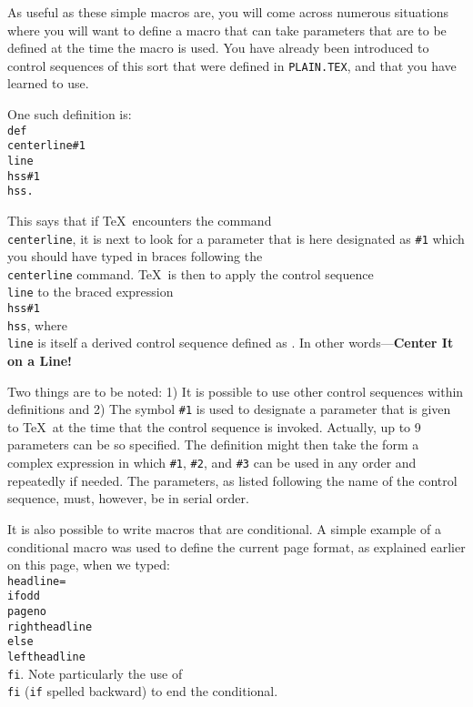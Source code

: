 As useful as these simple macros are, you will come across numerous
situations where you will want to define a macro that can take parameters that
are to be defined at the time the macro is used. You have already been introduced
to control sequences of this sort that were defined in {\tt PLAIN.TEX}, and that you
have learned to use.

One such definition is:\quad
{\tt\\def\\centerline\#1\lbr \\line\lbr \\hss\#1\\hss\rrbr.}

This says that if \TeX\ encounters the command {\tt \\centerline}, it is
next to look for a parameter that is here designated as {\tt \#1} which you
should have typed in braces following the {\tt \\centerline} command.
\TeX\ is then to apply the control sequence {\tt \\line\/} to the braced
expression {\tt \\hss\#1\\hss}, where 
{\tt\\line\/} is itself a derived control
sequence defined as .
In other words---{\bf Center It on a Line!}

Two things are to be noted: 1) It is possible to use other control
sequences within definitions and 2) The symbol {\tt\#1} is used to
designate a parameter that is given to \TeX\ at the time that the control
sequence is invoked.  Actually, up to 9 parameters can be so specified.
The definition might then take the form \lbr a
complex expression in which {\tt\#1}, {\tt\#2}, and {\tt\#3} can be used in any order and
repeatedly if needed\rbr. The parameters, as listed following the name of
the control sequence, must, however, be in serial order.

It is also possible to write macros that are conditional.  A
simple example of a conditional macro was used to define the current page
format, as explained earlier on this page,
when we typed:
{\tt \\headline=\lbr\\ifodd\\pageno\\rightheadline\\else\\leftheadline\\fi\rbr}.
Note particularly the use of {\tt \\fi} ({\tt if} spelled backward) to end the conditional.

